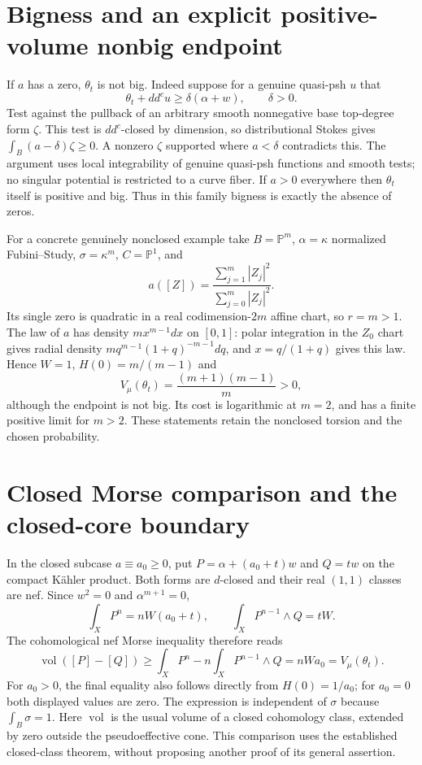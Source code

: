 \documentclass[11pt]{article}
\newcommand{\ddc}{dd^c}
\theoremstyle{remark}\newtheorem{remark}[theorem]{Remark}
\begin{document}
\section{Bigness and an explicit positive-volume nonbig endpoint}
If $a$ has a zero, $\theta_t$ is not big. Indeed suppose for a genuine
quasi-psh $u$ that
\[
 \theta_t+\ddc u\geq\delta(\alpha+w),\qquad\delta>0.
\]
Test against the pullback of an arbitrary smooth nonnegative base
top-degree form $\zeta$. This test is $\ddc$-closed by dimension, so
distributional Stokes gives
$\int_B(a-\delta)\zeta\geq0$.
A nonzero $\zeta$ supported where $a<\delta$ contradicts this.
The argument uses local integrability of genuine quasi-psh functions
and smooth tests; no singular potential is restricted to a curve fiber.
If $a>0$ everywhere then $\theta_t$ itself is positive and big.
Thus in this family bigness is exactly the absence of zeros.

For a concrete genuinely nonclosed example take $B=\mathbb P^m$,
$\alpha=\kappa$ normalized Fubini--Study, $\sigma=\kappa^m$,
$C=\mathbb P^1$, and
\[
 a([Z])=\frac{\sum_{j=1}^m|Z_j|^2}{\sum_{j=0}^m|Z_j|^2}.
\]
Its single zero is quadratic in a real codimension-$2m$ affine chart,
so $r=m>1$. The law of $a$ has density $m x^{m-1}dx$ on $[0,1]$:
polar integration in the $Z_0$ chart gives radial density
$m q^{m-1}(1+q)^{-m-1}dq$, and $x=q/(1+q)$ gives this law.
Hence $W=1$, $H(0)=m/(m-1)$ and
\[
 V_\mu(\theta_t)=\frac{(m+1)(m-1)}m>0,
\]
although the endpoint is not big. Its cost is logarithmic at $m=2$,
and has a finite positive limit for $m>2$.
These statements retain the nonclosed torsion and the chosen probability.

\section{Closed Morse comparison and the closed-core boundary}
In the closed subcase $a\equiv a_0\geq0$, put
$P=\alpha+(a_0+t)w$ and $Q=tw$ on the compact K\"ahler product.
Both forms are $d$-closed and their real $(1,1)$ classes are nef.
Since $w^2=0$ and $\alpha^{m+1}=0$,
\[
 \int_X P^n=nW(a_0+t),\qquad
 \int_X P^{n-1}\wedge Q=tW.
\]
The cohomological nef Morse inequality
\cite[Theorem 1.1]{Morse} therefore reads
\[
 \operatorname{vol}([P]-[Q])\geq
 \int_XP^n-n\int_XP^{n-1}\wedge Q
 =nWa_0=V_\mu(\theta_t).
\]
For $a_0>0$, the final equality also follows directly from
$H(0)=1/a_0$; for $a_0=0$ both displayed values are zero.
The expression is independent of $\sigma$ because $\int_B\sigma=1$.
Here $\operatorname{vol}$ is the usual volume of a closed cohomology
class, extended by zero outside the pseudoeffective cone.
This comparison uses the established closed-class theorem, without
proposing another proof of its general assertion.
\end{document}

